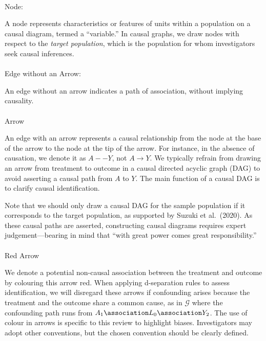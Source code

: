 \documentclass[
  single column]{article}
\makeatletter
\let\oldparagraph\paragraph
\renewcommand{\paragraph}{
    \@ifstar
      \xxxParagraphStar
      \xxxParagraphNoStar
  }
\newcommand{\xxxParagraphStar}[1]{\oldparagraph*{#1}\mbox{}}
\newcommand{\xxxParagraphNoStar}[1]{\oldparagraph{#1}\mbox{}}
\makeatother
\begin{document}
\paragraph{Node:}\label{node}

A node represents characteristics or features of units within a
population on a causal diagram, termed a ``variable.'' In causal graphs,
we draw nodes with respect to the \emph{target population}, which is the
population for whom investigators seek causal inferences.

\paragraph{Edge without an Arrow:}\label{edge-without-an-arrow}

An edge without an arrow indicates a path of association, without
implying causality.

\paragraph{Arrow}\label{arrow}

An edge with an arrow represents a causal relationship from the node at
the base of the arrow to the node at the tip of the arrow. For instance,
in the absence of causation, we denote it as \(A -- Y\), not
\(A \rightarrow Y\). We typically refrain from drawing an arrow from
treatment to outcome in a causal directed acyclic graph (DAG) to avoid
asserting a causal path from \(A\) to \(Y\). The main function of a
causal DAG is to clarify causal identification.

Note that we should only draw a causal DAG for the sample population if
it corresponds to the target population, as supported by Suzuki et
al.~(2020). As these causal paths are asserted, constructing causal
diagrams requires expert judgement---bearing in mind that ``with great
power comes great responsibility.''

\paragraph{Red Arrow}\label{red-arrow}

We denote a potential non-causal association between the treatment and
outcome by colouring this arrow red. When applying d-separation rules to
assess identification, we will disregard these arrows if confounding
arises because the treatment and the outcome share a common cause, as in
\(\mathcal{G}\) where the confounding path runs from
\(A_1 \association L_0 \association Y_2\). The use of colour in arrows
is specific to this review to highlight biases. Investigators may adopt
other conventions, but the chosen convention should be clearly defined.
\end{document}
